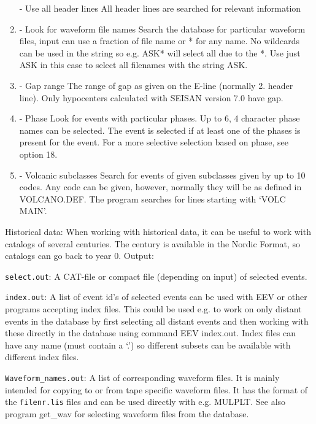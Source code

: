 \begin{enumerate}
- Use all header lines\newline
All header lines are searched for relevant information 
\item 
- Look for waveform file names\newline
Search the database for particular waveform files, input can use a fraction of file name or * for any name. No wildcards can be used in the string so e.g. ASK* will select all due to the *. Use just ASK in this case to select all filenames with the string ASK. 
\item 
- Gap range\newline
The range of gap as given on the E-line (normally 2. header line). Only hypocenters calculated with SEISAN version 7.0 have gap. 
\item 
- Phase \newline
Look for events with particular phases. Up to 6, 4 character phase names can be selected. The event is selected if at least one of the phases is present for the event. For a more selective selection based on phase, see option 18. 
\item 
- Volcanic subclasses \newline
Search for events of given subclasses given by up to 10 codes. Any code can be given, however, normally they will be as defined in VOLCANO.DEF. The program searches for lines starting with `VOLC MAIN'. 
\end{enumerate}

Historical data: When working with historical data, it can be useful to work with catalogs of several centuries. The century is available in the Nordic Format, so catalogs can go back to year 0. 
Output: 

\texttt{select.out}: A CAT-file or compact file (depending on input) of selected events.  

\texttt{index.out}: 
A list of event id's of selected events can be used with EEV or other programs accepting index files. This could be used e.g. to work on only distant events in the database by first selecting all distant events and then working with these directly in the database using command EEV index.out. Index files can have any name (must contain a `.') so different subsets can be available with different index files.  

\texttt{Waveform\_names.out}: 
A list of corresponding waveform files. It is mainly 
intended for copying to or from tape specific waveform files.  It has the format of the \texttt{filenr.lis} files and can be used directly with e.g. MULPLT. See also program get\_wav for selecting waveform files from the database. 

